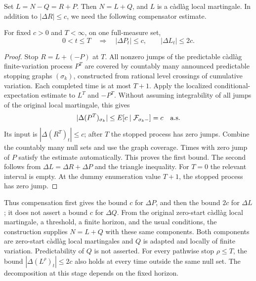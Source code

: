 Set $L=N-Q=R+P$. Then $N=L+Q$, and $L$ is a c\`adl\`ag local martingale.
In addition to $|\Delta R|\leq c$, we need the following compensator estimate.
\begin{lemma}\label{lem:compensator-jump-bound}
For fixed $c>0$ and $T<\infty$, on one full-measure set,
\[
 0<t\leq T\quad\Longrightarrow\quad
 |\Delta P_t|\leq c,\qquad |\Delta L_t|\leq2c.
\]
\end{lemma}
\begin{proof}
Stop $R=L+(-P)$ at $T$. All nonzero jumps of the predictable c\`adl\`ag
finite-variation process $P^T$ are covered by countably many announced
predictable stopping graphs $(\sigma_k)$, constructed from rational level
crossings of cumulative variation. Each completed time is at most $T+1$.
Apply the localized conditional-expectation estimate to $L^T$ and $-P^T$.
Without assuming integrability of all jumps of the original local
martingale, this gives
\[
 |\Delta(P^T)_{\sigma_k}|
 \leq E[c\mid\mathcal F_{\sigma_k-}]=c\quad\text{a.s.}
\]
Its input is $|\Delta(R^T)_t|\leq c$; after $T$ the stopped process has
zero jumps. Combine the countably many null sets and use the graph
coverage. Times with zero jump of $P$ satisfy the estimate automatically.
This proves the first bound. The second follows from
$\Delta L=\Delta R+\Delta P$ and the triangle inequality.
For $T=0$ the relevant interval is empty. At the dummy enumeration value
$T+1$, the stopped process has zero jump.
\end{proof}
Thus compensation first gives the bound $c$ for $\Delta P$, and then the
bound $2c$ for $\Delta L$; it does not assert a bound $c$ for $\Delta Q$.
From the original zero-start c\`adl\`ag local martingale, a threshold,
a finite horizon, and the usual conditions, the construction supplies
$N=L+Q$ with these same components. Both components are zero-start
c\`adl\`ag local martingales and $Q$ is adapted and locally of finite
variation. Predictability of $Q$ is not asserted.
For every pathwise stop $\rho\leq T$, the bound
$|\Delta(L^\rho)_t|\leq2c$ also holds at every time outside the same null
set. The decomposition at this stage depends on the fixed horizon.

